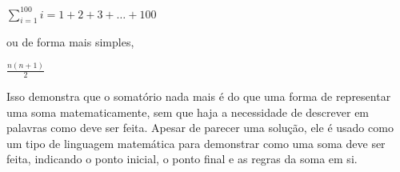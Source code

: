 \documentclass[12pt]{article}
\begin{document}
	$\sum_{i=1}^{100}{i} = 1+2+3+\dots+100$  
	
	
	ou de forma mais simples,
	
	
	$\frac{n(n+1)}{2}$
	
	Isso demonstra que o somatório nada mais é do que uma forma de representar uma soma matematicamente, sem que haja a necessidade de descrever em palavras como deve ser feita. Apesar de parecer uma solução, ele é usado como um tipo de linguagem matemática para demonstrar como uma soma deve ser feita, indicando o ponto inicial, o ponto final e as regras da soma em si.
	
	
	
	
	

	
	
	
	
	
\end{document}
